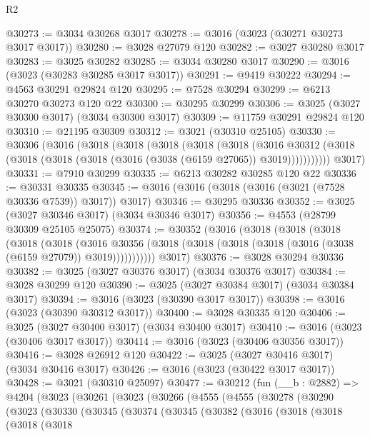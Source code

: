 \begin{lexlean}{R2}
\begin{coremodule}
@30273 := @3034 @30268 @3017
@30278 := @3016 (@3023 (@30271 @30273 @3017 @3017))
@30280 := @3028 @27079 @120
@30282 := @3027 @30280 @3017
@30283 := @3025 @30282
@30285 := @3034 @30280 @3017
@30290 := @3016 (@3023 (@30283 @30285 @3017 @3017))
@30291 := @9419 @30222
@30294 := @4563 @30291 @29824 @120
@30295 := @7528 @30294
@30299 := @6213 @30270 @30273 @120 @22
@30300 := @30295 @30299
@30306 := @3025 (@3027 @30300 @3017) (@3034 @30300 @3017)
@30309 := @11759 @30291 @29824 @120
@30310 := @21195 @30309
@30312 := @3021 (@30310 @25105)
@30330 := @30306
    (@3016
      (@3018
        (@3018
          (@3018
            (@3018
              (@3018
                (@3016
                  @30312
                  (@3018 (@3018 (@3018 (@3018 (@3016 (@3038 (@6159 @27065)) @3019)))))))))))
      @3017)
@30331 := @7910 @30299
@30335 := @6213 @30282 @30285 @120 @22
@30336 := @30331 @30335
@30345 := @3016 (@3016 (@3018 (@3016 (@3021 (@7528 @30336 @7539)) @3017)) @3017)
@30346 := @30295 @30336
@30352 := @3025 (@3027 @30346 @3017) (@3034 @30346 @3017)
@30356 := @4553 (@28799 @30309 @25105 @25075)
@30374 := @30352
    (@3016
      (@3018
        (@3018
          (@3018
            (@3018
              (@3018
                (@3016
                  @30356
                  (@3018 (@3018 (@3018 (@3018 (@3016 (@3038 (@6159 @27079)) @3019)))))))))))
      @3017)
@30376 := @3028 @30294 @30336
@30382 := @3025 (@3027 @30376 @3017) (@3034 @30376 @3017)
@30384 := @3028 @30299 @120
@30390 := @3025 (@3027 @30384 @3017) (@3034 @30384 @3017)
@30394 := @3016 (@3023 (@30390 @3017 @3017))
@30398 := @3016 (@3023 (@30390 @30312 @3017))
@30400 := @3028 @30335 @120
@30406 := @3025 (@3027 @30400 @3017) (@3034 @30400 @3017)
@30410 := @3016 (@3023 (@30406 @3017 @3017))
@30414 := @3016 (@3023 (@30406 @30356 @3017))
@30416 := @3028 @26912 @120
@30422 := @3025 (@3027 @30416 @3017) (@3034 @30416 @3017)
@30426 := @3016 (@3023 (@30422 @3017 @3017))
@30428 := @3021 (@30310 @25097)
@30477 := @30212
    (fun (__b : @2882) =>
    @4204
      (@3023
        (@30261
          (@3023
            (@30266
              (@4555
                (@4555
                  (@30278
                    (@30290
                      (@3023
                        (@30330
                          (@30345
                            (@30374
                              (@30345
                                (@30382
                                  (@3016
                                    (@3018
                                      (@3018
                                        (@3018
                                          (@3018

\end{coremodule}
\end{lexlean}
